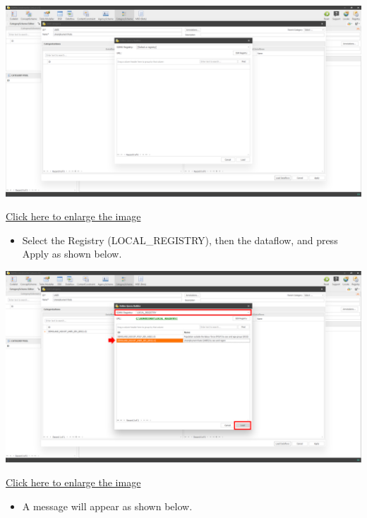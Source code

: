 \documentclass[
]{book}
\providecommand{\tightlist}{%
  \setlength{\itemsep}{0pt}\setlength{\parskip}{0pt}}
\begin{document}
\begin{center}\includegraphics[width=1\linewidth]{./images/image168} \end{center}

\href{images/image168.png}{Click here to enlarge the image}

\begin{itemize}
\tightlist
\item
  Select the Registry (LOCAL\_REGISTRY), then the dataflow, and press Apply as shown below.
\end{itemize}

\begin{center}\includegraphics[width=1\linewidth]{./images/image170} \end{center}

\href{images/image170.png}{Click here to enlarge the image}

\begin{itemize}
\tightlist
\item
  A message will appear as shown below.
\end{itemize}
\end{document}
